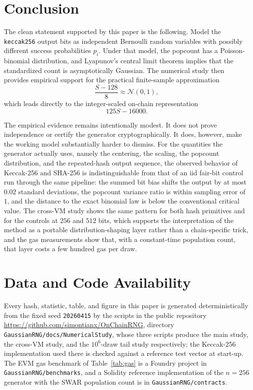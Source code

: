 \documentclass[11pt]{article}
\begin{document}
\section{Conclusion}

The clean statement supported by this paper is the following. Model the
\texttt{keccak256} output bits as independent Bernoulli random variables with
possibly different success probabilities $p_i$. Under that model, the popcount
has a Poisson-binomial distribution, and Lyapunov's central limit theorem
implies that the standardized count is asymptotically Gaussian. The numerical
study then provides empirical support for the practical finite-sample
approximation
\[
\frac{S-128}{8} \approx \mathcal{N}(0,1),
\]
which leads directly to the integer-scaled on-chain representation
\[
125S - 16000.
\]

The empirical evidence remains intentionally modest. It does not prove
independence or certify the generator cryptographically. It does, however, make
the working model substantially harder to dismiss. For the quantities the
generator actually uses, namely the centering, the scaling, the popcount
distribution, and the repeated-hash output sequence, the observed behavior of
Keccak-256 and SHA-256 is indistinguishable from that of an iid fair-bit
control run through the same pipeline: the summed bit bias shifts the output
by at most $0.02$ standard deviations, the popcount variance ratio is within
sampling error of $1$, and the distance to the exact binomial law is below
the conventional critical value. The cross-VM study shows the same pattern
for both hash primitives and for the controls at $256$ and $512$ bits, which
supports the interpretation of the method as a portable distribution-shaping
layer rather than a chain-specific trick, and the gas measurements show that,
with a constant-time population count, that layer costs a few hundred gas per
draw.

\section*{Data and Code Availability}

Every hash, statistic, table, and figure in this paper is generated
deterministically from the fixed seed \texttt{20260415} by the scripts in the
public repository \url{https://github.com/simontianx/OnChainRNG}, directory
\texttt{GaussianRNG/docs/NumericalStudy}, whose three scripts produce the main
study, the cross-VM study, and the $10^{6}$-draw tail study respectively; the
Keccak-256 implementation used there is checked against a reference test
vector at start-up. The EVM gas
benchmark of Table~\ref{tab:gas} is a Foundry project in
\texttt{GaussianRNG/benchmarks}, and a Solidity reference implementation of
the $n=256$ generator with the SWAR population count is in
\texttt{GaussianRNG/contracts}.
\end{document}
